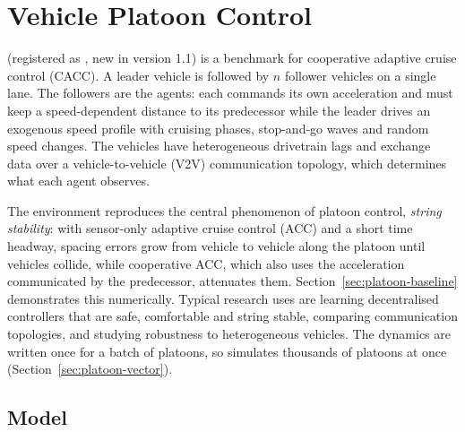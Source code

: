 \begingroup
\setlength{\emergencystretch}{3em}
\chapter{Vehicle Platoon Control}\label{chap:platoon}

 (registered as , new in
version 1.1) is a benchmark for cooperative adaptive cruise control (CACC). A
leader vehicle is followed by $n$ follower vehicles on a single lane. The
followers are the agents: each commands its own acceleration and must keep a
speed-dependent distance to its predecessor while the leader drives an
exogenous speed profile with cruising phases, stop-and-go waves and random
speed changes. The vehicles have heterogeneous drivetrain lags and exchange data
over a vehicle-to-vehicle (V2V) communication topology, which determines what
each agent observes.

The environment reproduces the central phenomenon of platoon control,
\emph{string stability}: with sensor-only adaptive cruise control (ACC) and a
short time headway, spacing errors grow from vehicle to vehicle along the
platoon until vehicles collide, while cooperative ACC, which also uses the
acceleration communicated by the predecessor, attenuates them.
Section~\ref{sec:platoon-baseline} demonstrates this numerically. Typical
research uses are learning decentralised controllers that are safe, comfortable
and string stable, comparing communication topologies, and studying robustness
to heterogeneous vehicles. The dynamics are written once for a batch of
platoons, so  simulates thousands of platoons at once
(Section~\ref{sec:platoon-vector}).

\section{Model}\label{sec:platoon-model}

